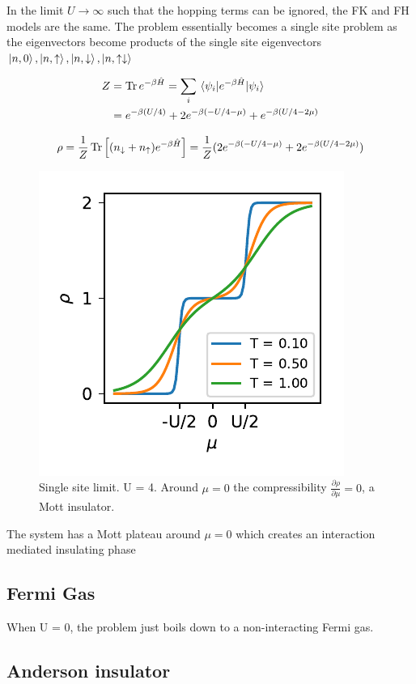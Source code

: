 \documentclass[a4paper, 11pt, onecolumn]{article}
\begin{document}
In the limit $U \rightarrow \infty$ such that the hopping terms can be ignored, the FK and FH models are the same. The problem essentially becomes a single site problem as the eigenvectors become products of the single site eigenvectors $\ket{n, 0}, \ket{n, \uparrow}, \ket{n, \downarrow}, \ket{n, \uparrow \downarrow}$

\begin{align*} Z &= \Tr e^{-\beta \hat{H}} = \sum_{i} \ev{e^{-\beta \hat{H}}}{\psi_i} \\ 
&= e^{-\beta (U / 4)} + 2e^{-\beta (-U/4 - \mu)} + e^{-\beta(U/4 - 2\mu)}
\end{align*}

$$\rho = \frac{1}{Z}\Tr\left[ (n_{\downarrow} + n_{\uparrow}) e^{-\beta \hat{H}} \right] = \frac{1}{Z} (2e^{-\beta (-U/4 - \mu)} + 2e^{-\beta(U/4 - 2\mu)})$$


\begin{figure}
  \centering
    \includegraphics[width=.5\textwidth]{single_site_limit.pdf}
  \caption{Single site limit. U = 4. Around $\mu = 0$ the compressibility $\frac{\partial \rho}{\partial \mu} = 0$, a Mott insulator.}
  \label{fig:single_site_limit}
\end{figure}

The system has a Mott plateau around $\mu = 0$ which creates an interaction mediated insulating phase


\subsection{Fermi Gas}
When U = 0, the problem just boils down to a non-interacting Fermi gas.

\subsection{Anderson insulator}
\end{document}
